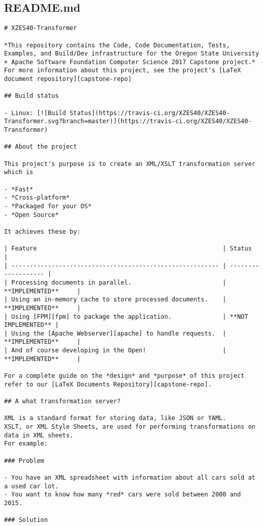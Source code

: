 \subsection{README.md}
\begin{lstlisting}
# XZES40-Transformer

*This repository contains the Code, Code Documentation, Tests, Examples, and Build/Dev infrastructure for the Oregon State University + Apache Software Foundation Computer Science 2017 Capstone project.*
For more information about this project, see the project's [LaTeX document repository][capstone-repo]

## Build status

- Linux: [![Build Status](https://travis-ci.org/XZES40/XZES40-Transformer.svg?branch=master)](https://travis-ci.org/XZES40/XZES40-Transformer)

## About the project

This project's purpose is to create an XML/XSLT transformation server which is

- *Fast*
- *Cross-platform*
- *Packaged for your OS*
- *Open Source*

It achieves these by:

| Feature                                                   | Status              |
| --------------------------------------------------------- | ------------------- |
| Processing documents in parallel.                         | **IMPLEMENTED**     |
| Using an in-memory cache to store processed documents.    | **IMPLEMENTED**     |
| Using [FPM][fpm] to package the application.              | **NOT IMPLEMENTED** |
| Using the [Apache Webserver][apache] to handle requests.  | **IMPLEMENTED**     |
| And of course developing in the Open!                     | **IMPLEMENTED**     |

For a complete guide on the *design* and *purpose* of this project refer to our [LaTeX Documents Repository][capstone-repo].

## A what transformation server?

XML is a standard format for storing data, like JSON or YAML.
XSLT, or XML Style Sheets, are used for performing transformations on data in XML sheets.
For example:

### Problem

- You have an XML spreadsheet with information about all cars sold at a used car lot.
- You want to know how many *red* cars were sold between 2000 and 2015.

### Solution


\end{lstlisting}
